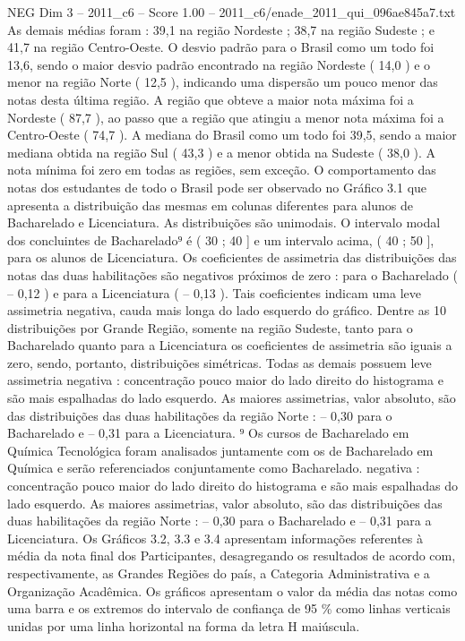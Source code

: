 \begin{textsample}{NEG Dim 3 – 2011\_c6 – Score 1.00 – 2011\_c6/enade\_2011\_qui\_096ae845a7.txt}
As demais médias foram : 39,1 na região Nordeste ; 38,7 na região Sudeste ; e 41,7 na região Centro-Oeste.
O desvio padrão para o Brasil como um todo foi 13,6, sendo o maior desvio padrão encontrado na região Nordeste ( 14,0 ) e o menor na região Norte ( 12,5 ), indicando uma dispersão um pouco menor das notas desta última região.
A região que obteve a maior nota máxima foi a Nordeste ( 87,7 ), ao passo que a região que atingiu a menor nota máxima foi a Centro-Oeste ( 74,7 ).
A mediana do Brasil como um todo foi 39,5, sendo a maior mediana obtida na região Sul ( 43,3 ) e a menor obtida na Sudeste ( 38,0 ).
A nota mínima foi zero em todas as regiões, sem exceção.
O comportamento das notas dos estudantes de todo o Brasil pode ser observado no Gráfico 3.1 que apresenta a distribuição das mesmas em colunas diferentes para alunos de Bacharelado e Licenciatura.
As distribuições são unimodais.
O intervalo modal dos concluintes de Bacharelado⁹ é ( 30 ; 40 ] e um intervalo acima, ( 40 ; 50 ], para os alunos de Licenciatura.
Os coeficientes de assimetria das distribuições das notas das duas habilitações são negativos próximos de zero : para o Bacharelado ( – 0,12 ) e para a Licenciatura ( – 0,13 ).
Tais coeficientes indicam uma leve assimetria negativa, cauda mais longa do lado esquerdo do gráfico.
Dentre as 10 distribuições por Grande Região, somente na região Sudeste, tanto para o Bacharelado quanto para a Licenciatura os coeficientes de assimetria são iguais a zero, sendo, portanto, distribuições simétricas.
Todas as demais possuem leve assimetria negativa : concentração pouco maior do lado direito do histograma e são mais espalhadas do lado esquerdo.
As maiores assimetrias, valor absoluto, são das distribuições das duas habilitações da região Norte : – 0,30 para o Bacharelado e – 0,31 para a Licenciatura. ⁹ Os cursos de Bacharelado em Química Tecnológica foram analisados juntamente com os de Bacharelado em Química e serão referenciados conjuntamente como Bacharelado. negativa : concentração pouco maior do lado direito do histograma e são mais espalhadas do lado esquerdo.
As maiores assimetrias, valor absoluto, são das distribuições das duas habilitações da região Norte : – 0,30 para o Bacharelado e – 0,31 para a Licenciatura.
Os Gráficos 3.2, 3.3 e 3.4 apresentam informações referentes à média da nota final dos Participantes, desagregando os resultados de acordo com, respectivamente, as Grandes Regiões do país, a Categoria Administrativa e a Organização Acadêmica.
Os gráficos apresentam o valor da média das notas como uma barra e os extremos do intervalo de confiança de 95 \% como linhas verticais unidas por uma linha horizontal na forma da letra H maiúscula.

\end{textsample}
